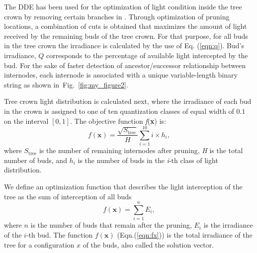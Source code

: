 The DDE has
been used for the optimization of light condition inside the tree crown
by removing certain branches in \cite{strnad_novel_2017}.
Through optimization of pruning locations, a combination of cuts is obtained
that maximizes the amount of light received by the remaining buds of the
tree crown. For that purpose, for all buds in the tree crown the
irradiance is calculated by the use of Eq. (\ref{eqn:q}). Bud's irradiance, \(Q\)
corresponds to the percentage of available light intercepted by the bud.
For the sake of faster detection of ancestor/successor relationship
between internodes, each internode is associated with a unique
variable-length binary string as shown in~Fig.~\ref{fig:my_figure2}. 

Tree crown light
distribution is calculated next, where the irradiance of each bud in the crown is assigned to one of ten quantization classes of equal width of $0.1$ on
the interval $[0, 1]$. The objective function 
\emph{f}(\textbf{x}) is:
\begin{equation}
 f\left( \mathbf{x} \right) = \frac{\sqrt{S_{\mathrm{\text{tree}}}}}{H}\sum_{i = 1}^{10}{i \times h_{i}}, 
\end{equation}
where \(S_{\mathrm{\text{tree}}}\) is the number of remaining internodes
after pruning, \emph{H} is the total number of buds, and \(h_{i}\) is
the number of buds in the \emph{i}-th class of light distribution.

We define an optimization function that describes the light interception
of the tree as the sum of interception of all buds
\begin{equation}
   f\left( \mathbf{x} \right) = \sum_{i = 1}^{n}E_{i},\label{eqn:fx}
\end{equation}
where $n$ is the number of buds that remain after the pruning,
$E_{i}$ is the irradiance of the \(i\)-th bud. The function $f(\mathbf{x})$ (Eqn.(\ref{eqn:fx})) is the total irradiance of the tree for a configuration \(x\) of the buds,
also called the solution vector. 


